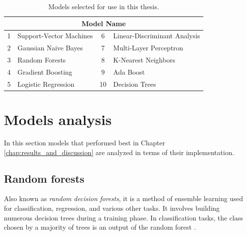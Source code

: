         \begin{table}[htbp]
            \centering
            \begin{tabular}{@{}clcl@{}}
                \toprule
                \multicolumn{4}{c}{\textbf{Model Name}} \\
                \midrule
                1 & Support-Vector Machines & 6 & Linear-Discriminant Analysis \\
                2 & Gaussian Naive Bayes & 7 & Multi-Layer Perceptron \\
                3 & Random Forests & 8 & K-Nearest Neighbors \\
                4 & Gradient Boosting & 9 & Ada Boost \\
                5 & Logistic Regression & 10 & Decision Trees \\
                \bottomrule
            \end{tabular}
            \caption{Models selected for use in this thesis.}
            \label{tab:movements_table}
        \end{table}
    
    \section{Models analysis}
        
        In this section models that performed best in Chapter \ref{chap:results_and_discussion} are analyzed in terms of their implementation.

        \subsection{Random forests}
           Also known as \textit{random decision forests}, it is a method of ensemble learning used for classification, regression, and various other tasks. It involves building numerous decision trees during a training phase. In classification tasks, the class chosen by a majority of trees is an output of the random forest \cite{ho_random_1998}.

